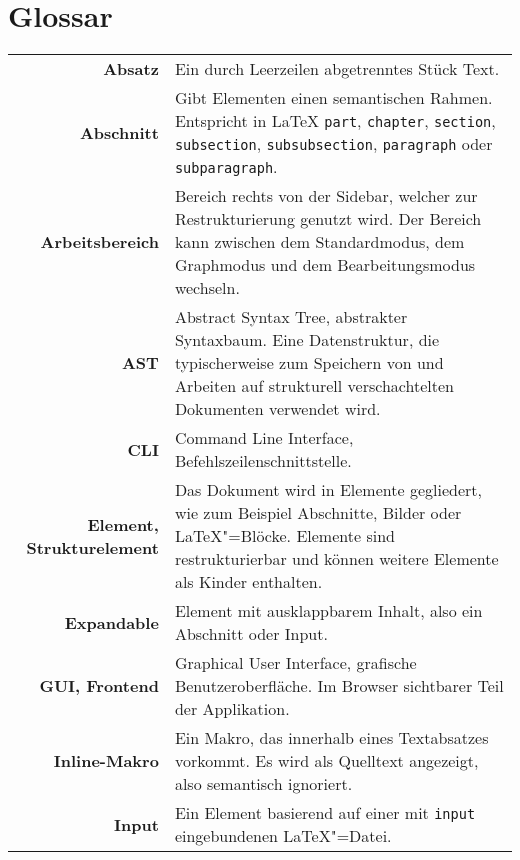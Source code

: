 \section{Glossar}
\label{sec:glossar}

\setlength{\extrarowheight}{2em}

\begin{longtable}{>{\bfseries}rp{9cm}}
  Absatz &
  Ein durch Leerzeilen abgetrenntes Stück Text. \\

  Abschnitt &
  Gibt Elementen einen semantischen Rahmen.
  Entspricht in \LaTeX{} \verb|part|, \verb|chapter|, \verb|section|, \verb|subsection|, \verb|subsubsection|,
  \verb|paragraph| oder \verb|subparagraph|. \\

  Arbeitsbereich &
  Bereich rechts von der Sidebar, welcher zur Restrukturierung genutzt wird.
  Der Bereich kann zwischen dem Standardmodus, dem Graphmodus und dem Bearbeitungsmodus wechseln. \\

  AST &
  Abstract Syntax Tree, abstrakter Syntaxbaum.
  Eine Datenstruktur, die typischerweise zum Speichern von und Arbeiten auf strukturell verschachtelten Dokumenten
  verwendet wird. \\

  CLI &
  Command Line Interface, Befehlszeilenschnittstelle. \\

  Element, Strukturelement &
  Das Dokument wird in Elemente gegliedert, wie zum Beispiel Abschnitte, Bilder oder \LaTeX"=Blöcke.
  Elemente sind restrukturierbar und können weitere Elemente als Kinder enthalten. \\

  Expandable &
  Element mit ausklappbarem Inhalt, also ein Abschnitt oder Input. \\

  GUI, Frontend &
  Graphical User Interface, grafische Benutzeroberfläche.
  Im Browser sichtbarer Teil der Applikation. \\

  Inline-Makro &
  Ein Makro, das innerhalb eines Textabsatzes vorkommt.
  Es wird als Quelltext angezeigt, also semantisch ignoriert. \\

  Input &
  Ein Element basierend auf einer mit \verb|input| eingebundenen \LaTeX"=Datei. \\


\end{longtable}

